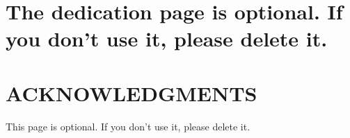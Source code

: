 \documentclass[12pt]{report}
\begin{document}
{} \setcounter{page}{2}

\chapter*{The dedication page is optional. If you don't use it, please delete it.}
\vspace{7mm}

\chapter*{ACKNOWLEDGMENTS}
\vspace{7mm}
This page is optional. If you don't use it, please delete it.
\tableofcontents

\listoftables
\newpage
\listoffigures
\newpage
\normalsize
{}
\setcounter{page}{1}

\doublespacing


\singlespacing
\begin{appendices}
	
\end{appendices}
\end{document}
